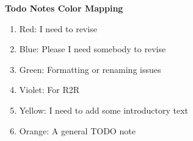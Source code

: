 \newpage

\textbf{Todo Notes Color Mapping}

\begin{enumerate}
    \item {} Red: I need to revise 
    \item {} Blue: Please I need somebody to revise
    \item {} Green: Formatting or renaming issues
    \item {} Violet: For R2R 
    \item {} Yellow: I need to add some introductory text
    \item {} Orange: A general TODO note
    
\end{enumerate}


\listoftodos[Notes]
